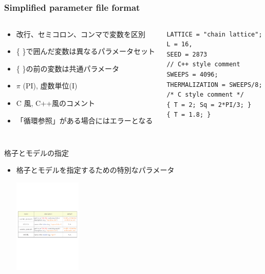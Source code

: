 \subsection*{\redm\whiteb\greenb}
\begin{frame}[t,fragile]
  \frametitle{Simplified parameter file format}
  \begin{columns}[T]
    \begin{column}{.5\textwidth}
      \begin{itemize}
        \item 改行、セミコロン、コンマで変数を区別
        \item \{ \}で囲んだ変数は異なるパラメータセット
        \item \{ \}の前の変数は共通パラメータ
        \item $\pi$ (PI), 虚数単位(I)
        \item C 風, C++風のコメント
        \item 「循環参照」がある場合にはエラーとなる
      \end{itemize}
    \end{column}
    \begin{column}{.5\textwidth}
    \begin{lstlisting}
LATTICE = "chain lattice";
L = 16,
SEED = 2873
// C++ style comment
SWEEPS = 4096;
THERMALIZATION = SWEEPS/8;
/* C style comment */
{ T = 2; Sq = 2*PI/3; }
{ T = 1.8; }
    \end{lstlisting}
    \end{column}
  \end{columns}
\end{frame}

\subsection*{\redm\whiteb\greenb}
\begin{frame}{格子とモデルの指定}
  \begin{itemize}
  \item 格子とモデルを指定するための特別なパラメータ
  \begin{center}
    \includegraphics[height=4.5cm]{simulation5.pdf}
  \end{center}
  \end{itemize}
\end{frame}

